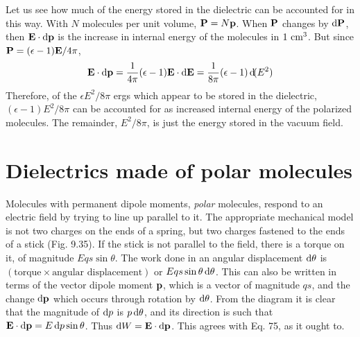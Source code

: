 Let us see how much of the energy stored in the dielectric can be
accounted for in this way. With $N$ molecules per unit volume,
$\mathbf{P} = N\mathbf{p}$. When $\mathbf{P}$ changes by $\operatorname{d\!}\mathbf{P}$, then $\mathbf{E}\cdot\operatorname{d\!}\mathbf{p}$
is the increase in internal
energy of the molecules in $1\ \cmunit^3$. But since $\mathbf{P}=(\epsilon-1)\mathbf{E}/4\pi$,
\begin{equation}
  \mathbf{E}\cdot\operatorname{d\!}\mathbf{p} = \frac{1}{4\pi}(\epsilon-1)\mathbf{E}\cdot\operatorname{d\!}\mathbf{E}
                        = \frac{1}{8\pi}(\epsilon-1)\operatorname{d\!}(E^2)
\end{equation}
Therefore, of the $\epsilon E^2/8\pi$ ergs which appear to be stored in the 
dielectric, $(\epsilon-1)E^2/8\pi$ can be accounted for as increased internal energy
of the polarized molecules. The remainder, $E^2/8\pi$, is just the energy
stored in the vacuum field.

\section{Dielectrics made of polar molecules}

Molecules with permanent dipole moments, \emph{polar} molecules,
respond to an electric field by trying to line up parallel to it. The
appropriate mechanical model is not two charges on the ends of a
spring, but two charges fastened to the ends of a stick (Fig. 9.35).
If the stick is not parallel to the field, there is a torque on it, of magnitude
$Eqs \sin \theta$. The work done in an angular displacement $\operatorname{d\!}\theta$ is
$(\text{torque} \times \text{angular displacement})$ or $Eqs \sin \theta\operatorname{d\!}\theta$. This can also
be written in terms of the vector dipole moment $\mathbf{p}$, which is a vector
of magnitude $qs$, and the change $\operatorname{d\!}\mathbf{p}$ which occurs through rotation
by $\operatorname{d\!}\theta$. From the diagram it is clear that the magnitude of $\operatorname{d\!} p$ is $p\operatorname{d\!}\theta$,
and its direction is such that $\mathbf{E}\cdot\operatorname{d\!}\mathbf{p}=E\operatorname{d\!} p\sin\theta$. Thus $\operatorname{d\!} W = \mathbf{E}\cdot\operatorname{d\!}\mathbf{p}$.
This agrees with Eq. 75, as it ought to.

